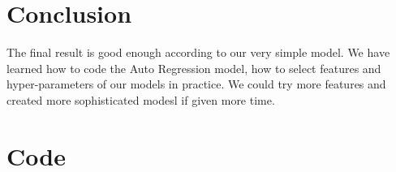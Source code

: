 \section{Conclusion}
The final result is good enough according to our very simple model. We have learned how to code the Auto Regression model, how to select features and hyper-parameters of our models in practice. We could try more features and created more sophisticated modesl if given more time.
\newpage
\section{Code}









